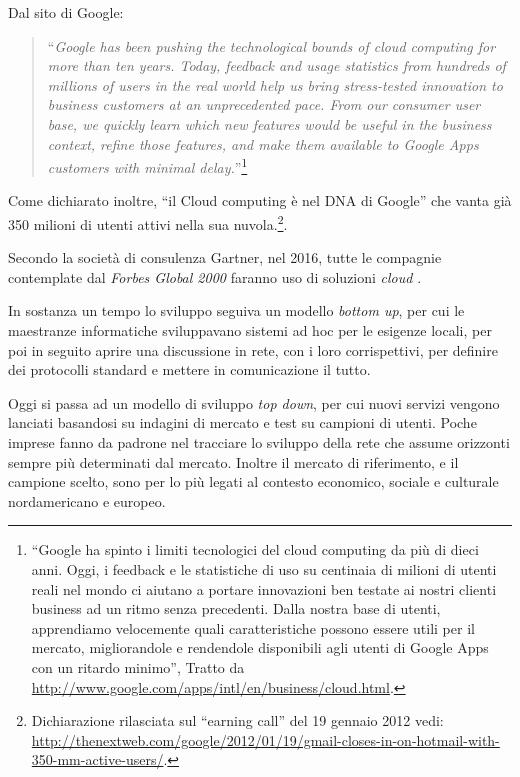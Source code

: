 Dal sito di Google:
\begin{quote}
  ``\emph{Google has been pushing the technological bounds of cloud
  computing for more than ten years. Today, feedback and usage
  statistics from hundreds of millions of users in the real world help
  us bring stress-tested innovation to business customers at an
  unprecedented pace. From our consumer user base, we quickly learn
  which new features would be useful in the business context, refine
  those features, and make them available to Google Apps customers
  with minimal delay.}''\footnote{``Google ha spinto i limiti
    tecnologici del cloud computing da più di dieci anni. Oggi, i
    feedback e le statistiche di uso su centinaia di milioni di utenti
    reali nel mondo ci aiutano a portare innovazioni ben testate ai
    nostri clienti business ad un ritmo senza precedenti. Dalla nostra
    base di utenti, apprendiamo velocemente quali caratteristiche
    possono essere utili per il mercato, migliorandole e rendendole
    disponibili agli utenti di Google Apps con un ritardo minimo'',
    Tratto da
    \url{http://www.google.com/apps/intl/en/business/cloud.html}.}
\end{quote}

Come dichiarato inoltre, ``il Cloud computing è nel DNA di Google''
che vanta già 350 milioni di utenti attivi nella sua
nuvola.\footnote{Dichiarazione rilasciata sul ``earning call'' del 19
  gennaio 2012 vedi:
  \url{http://thenextweb.com/google/2012/01/19/gmail-closes-in-on-hotmail-with-350-mm-active-users/}.}.

Secondo la società di consulenza Gartner, nel 2016, tutte le compagnie
contemplate dal \emph{Forbes Global 2000} faranno uso di soluzioni
\emph{cloud} \citep{EY2011}.

In sostanza un tempo lo sviluppo seguiva un modello \emph{bottom up}, per
cui le maestranze informatiche sviluppavano sistemi ad hoc per le
esigenze locali, per poi in seguito aprire una discussione in rete,
con i loro corrispettivi, per definire dei protocolli standard e
mettere in comunicazione il tutto.

Oggi si passa ad un modello di sviluppo \emph{top down}, per cui nuovi
servizi vengono lanciati basandosi su indagini di mercato e test su
campioni di utenti. Poche imprese fanno da padrone nel tracciare lo
sviluppo della rete che assume orizzonti sempre più determinati dal
mercato. Inoltre il mercato di riferimento, e il campione scelto, sono
per lo più legati al contesto economico, sociale e culturale
nordamericano e europeo. 

